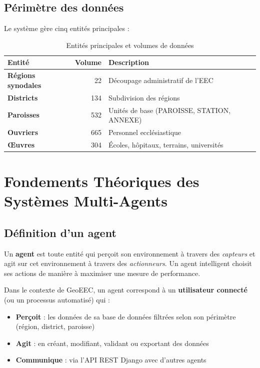 \documentclass[12pt, a4paper]{report}
\theoremstyle{definition}
\begin{document}
\section{Périmètre des données}

Le système gère cinq entités principales :

\begin{table}[H]
\centering
\caption{Entités principales et volumes de données}
\begin{tabularx}{\textwidth}{>{\bfseries}l r X}
\toprule
Entité & Volume & Description \\
\midrule
Régions synodales & 22 & Découpage administratif de l'EEC \\
Districts & 134 & Subdivision des régions \\
Paroisses & 532 & Unités de base (PAROISSE, STATION, ANNEXE) \\
Ouvriers & 665 & Personnel ecclésiastique \\
Œuvres & 304 & Écoles, hôpitaux, terrains, universités \\
\bottomrule
\end{tabularx}
\end{table}

\chapter{Fondements Théoriques des Systèmes Multi-Agents}

\section{Définition d'un agent}

\begin{tcolorbox}[defbox, title=Agent Intelligent (Russell \& Norvig)]
Un \textbf{agent} est toute entité qui perçoit son environnement à travers des \textit{capteurs} et agit sur cet environnement à travers des \textit{actionneurs}. Un agent intelligent choisit ses actions de manière à maximiser une mesure de performance.
\end{tcolorbox}

Dans le contexte de GeoEEC, un agent correspond à un \textbf{utilisateur connecté} (ou un processus automatisé) qui :
\begin{itemize}
  \item \textbf{Perçoit} : les données de sa base de données filtrées selon son périmètre (région, district, paroisse)
  \item \textbf{Agit} : en créant, modifiant, validant ou exportant des données
  \item \textbf{Communique} : via l'API REST Django avec d'autres agents
\end{itemize}
\end{document}

